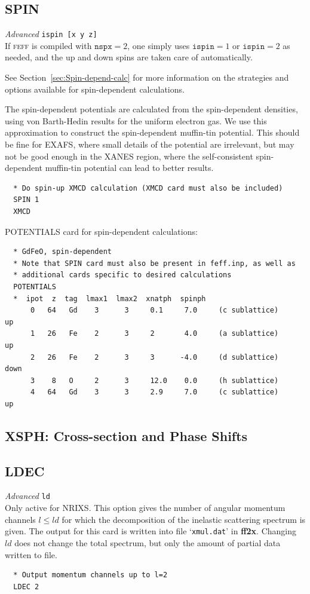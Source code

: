 \documentclass[11pt,oneside]{report} %
\newcommand{\program}[1]{\textsc{#1}}
\newcommand{\feff}{\program{feff}}
\newenvironment{Card}[4]%
      {\vspace{3ex}%
        \subsection{#1}
        \quad\textsl{#3}\newline
        \quad\texttt{#2}\newline%
        \label{card:#4}\\}
      {}
\newcommand{\file}[1]{`\texttt{#1}'}
\newcommand{\module}[1]{\textrm{\bf{#1}}}
\begin{document}
\begin{Card}{SPIN}{ispin [x  y  z] }{Advanced}{spi}
 If {\feff} is compiled with $\mathtt{nspx}=2$, one simply uses $\mathtt{ispin}=1$ 
 or $\mathtt{ispin}=2$ as needed, and the up and down spins are taken care of 
 automatically.
 \begin{latexonly}
   See Section~\ref{sec:Spin-depend-calc} for more information on 
   the strategies and options available for spin-dependent calculations.
 \end{latexonly}
  
  The spin-dependent potentials are calculated from the spin-dependent 
 densities, using von Barth-Hedin results for the uniform electron gas.
 We use this approximation to construct the spin-dependent muffin-tin potential. 
 This should be fine for EXAFS, where small details of the potential are irrelevant, 
 but may not be good enough in the XANES region, where the self-consistent 
 spin-dependent muffin-tin potential can lead to better results.

\begin{verbatim} 
  * Do spin-up XMCD calculation (XMCD card must also be included)
  SPIN 1
  XMCD
\end{verbatim}

POTENTIALS card for spin-dependent calculations:
\begin{verbatim} 
  * GdFeO, spin-dependent
  * Note that SPIN card must also be present in feff.inp, as well as 
  * additional cards specific to desired calculations
  POTENTIALS
  *  ipot  z  tag  lmax1  lmax2  xnatph  spinph
      0   64   Gd    3      3     0.1     7.0     (c sublattice)     up
      1   26   Fe    2      3     2       4.0     (a sublattice)     up
      2   26   Fe    2      3     3      -4.0     (d sublattice)     down
      3    8   O     2      3     12.0    0.0     (h sublattice)
      4   64   Gd    3      3     2.9     7.0     (c sublattice)     up
\end{verbatim}
\end{Card}



\subsection{XSPH: Cross-section and Phase Shifts}
\label{sec:Cross-section-phase}


\begin{Card}{LDEC} {ld}{Advanced}{lde}
    Only active for NRIXS.  This option gives the number of angular momentum channels $l \leq ld$ for which the decomposition
  of the inelastic scattering spectrum is given. The output for this card is written into file
  \file{xmul.dat} in \module{ff2x}.  Changing $ld$ does not change the total spectrum, but only the
  amount of partial data written to file.
\begin{verbatim}
  * Output momentum channels up to l=2
  LDEC 2
\end{verbatim}
\end{Card}
\end{document}
